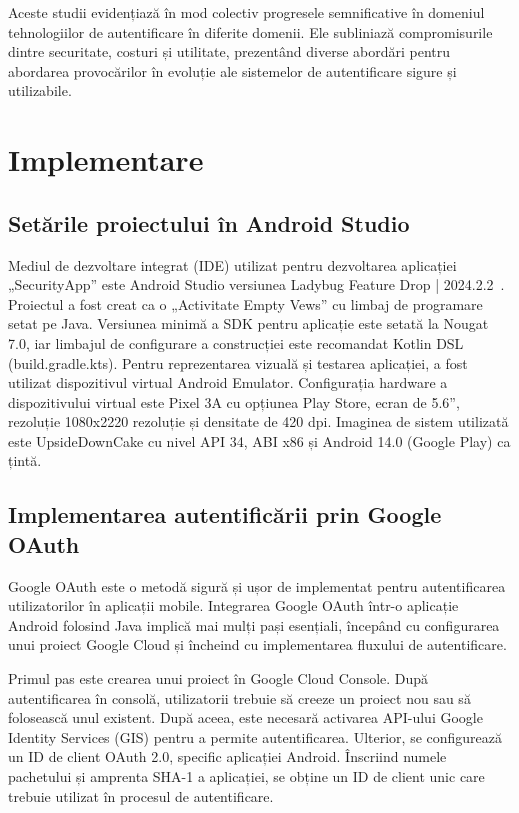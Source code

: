 \documentclass[runningheads]{llncs}
\begin{document}
Aceste studii evidențiază în mod colectiv progresele semnificative în domeniul tehnologiilor de autentificare în diferite domenii. Ele subliniază compromisurile dintre securitate, costuri și utilitate, prezentând diverse abordări pentru abordarea provocărilor în evoluție ale sistemelor de autentificare sigure și utilizabile.

\section{Implementare}

\subsection{Setările proiectului în Android Studio}

Mediul de dezvoltare integrat (IDE) utilizat pentru dezvoltarea aplicației „SecurityApp” este Android Studio versiunea Ladybug Feature Drop | 2024.2.2~\cite{androidstudio}. Proiectul a fost creat ca o „Activitate Empty Vews” cu limbaj de programare setat pe Java. Versiunea minimă a SDK pentru aplicație este setată la Nougat 7.0, iar limbajul de configurare a construcției este recomandat Kotlin DSL (build.gradle.kts). Pentru reprezentarea vizuală și testarea aplicației, a fost utilizat dispozitivul virtual Android Emulator. Configurația hardware a dispozitivului virtual este Pixel 3A cu opțiunea Play Store, ecran de 5.6'', rezoluție 1080x2220 rezoluție și densitate de 420 dpi. Imaginea de sistem utilizată este UpsideDownCake cu nivel API 34, ABI x86 și Android 14.0 (Google Play) ca țintă.

\subsection{Implementarea autentificării prin Google OAuth}

Google OAuth este o metodă sigură și ușor de implementat pentru autentificarea utilizatorilor în aplicații mobile. Integrarea Google OAuth într-o aplicație Android folosind Java implică mai mulți pași esențiali, începând cu configurarea unui proiect Google Cloud și încheind cu implementarea fluxului de autentificare.

Primul pas este crearea unui proiect în Google Cloud Console. După autentificarea în consolă, utilizatorii trebuie să creeze un proiect nou sau să folosească unul existent. După aceea, este necesară activarea API-ului Google Identity Services (GIS) pentru a permite autentificarea. Ulterior, se configurează un ID de client OAuth 2.0, specific aplicației Android. Înscriind numele pachetului și amprenta SHA-1 a aplicației, se obține un ID de client unic care trebuie utilizat în procesul de autentificare.
\end{document}
